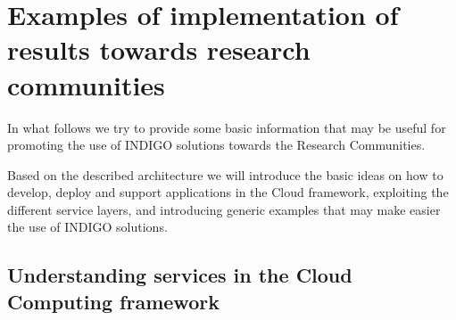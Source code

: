 \documentclass{article}
\begin{document}













\section{Examples of implementation of results towards research communities}
\label{sec:examples}

In what follows we try to provide some basic information that may be useful for promoting the use of INDIGO solutions towards the Research Communities.

Based on the described architecture we will introduce the basic ideas on how to develop, deploy and support applications in the Cloud framework, exploiting the different service layers, and introducing generic examples that may make easier the use of INDIGO solutions.   



\subsection{Understanding services in the Cloud Computing framework}
\end{document}
